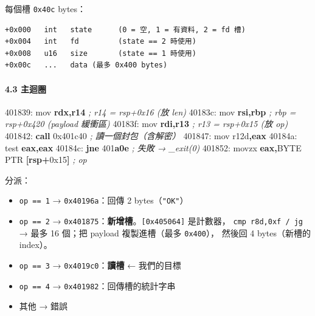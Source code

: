 \documentclass[10pt,a4paper]{article}
\newenvironment{Shaded}{\begin{snugshade}}{\end{snugshade}}
\newcommand{\BaseNTok}[1]{\textcolor[rgb]{0.00,0.00,0.81}{#1}}
\newcommand{\BuiltInTok}[1]{#1}
\newcommand{\CommentTok}[1]{\textcolor[rgb]{0.56,0.35,0.01}{\textit{#1}}}
\newcommand{\ControlFlowTok}[1]{\textcolor[rgb]{0.13,0.29,0.53}{\textbf{#1}}}
\newcommand{\DataTypeTok}[1]{\textcolor[rgb]{0.13,0.29,0.53}{#1}}
\newcommand{\DecValTok}[1]{\textcolor[rgb]{0.00,0.00,0.81}{#1}}
\newcommand{\ErrorTok}[1]{\textcolor[rgb]{0.64,0.00,0.00}{\textbf{#1}}}
\newcommand{\KeywordTok}[1]{\textcolor[rgb]{0.13,0.29,0.53}{\textbf{#1}}}
\newcommand{\NormalTok}[1]{#1}
\newcommand{\OperatorTok}[1]{\textcolor[rgb]{0.81,0.36,0.00}{\textbf{#1}}}
\renewenvironment{Shaded}{%
  \def\FrameCommand{\fboxsep=3.2pt\colorbox{shadecolor}}%
  \MakeFramed{\advance\hsize-\width\FrameRestore\small}%
}{%
  \endMakeFramed
}
\providecommand{\tightlist}{%
  \setlength{\itemsep}{0pt}\setlength{\parskip}{0pt}}
\begin{document}
每個槽 \texttt{0x40c} bytes：

\begin{Verbatim}[breaklines=true,breakanywhere=true,breakautoindent=false,fontsize=\fontsize{7.0}{9.5}\selectfont]
+0x000   int   state      (0 = 空, 1 = 有資料, 2 = fd 槽)
+0x004   int   fd         (state == 2 時使用)
+0x008   u16   size       (state == 1 時使用)
+0x00c   ...   data (最多 0x400 bytes)
\end{Verbatim}

\paragraph{4.3 主迴圈}\label{ux4e3bux8ff4ux5708}

\begin{Shaded}
\begin{Highlighting}[]
\NormalTok{401839:  }\BuiltInTok{mov}  \KeywordTok{rdx}\OperatorTok{,}\KeywordTok{r14}        \CommentTok{; r14 = rsp+0x16  (放 len)}
\NormalTok{40183c:  }\BuiltInTok{mov}  \KeywordTok{rsi}\OperatorTok{,}\KeywordTok{rbp}        \CommentTok{; rbp = rsp+0x420 (payload 緩衝區)}
\NormalTok{40183f:  }\BuiltInTok{mov}  \KeywordTok{rdi}\OperatorTok{,}\KeywordTok{r13}        \CommentTok{; r13 = rsp+0x15  (放 op)}
\NormalTok{401842:  }\ControlFlowTok{call} \BaseNTok{0x401c40}       \CommentTok{; 讀一個封包（含解密）}
\NormalTok{401847:  }\BuiltInTok{mov}\NormalTok{  r12d}\OperatorTok{,}\KeywordTok{eax}
\NormalTok{40184a:  }\BuiltInTok{test} \KeywordTok{eax}\OperatorTok{,}\KeywordTok{eax}
\NormalTok{40184c:  }\ControlFlowTok{jne}  \DecValTok{401}\ErrorTok{a0e}         \CommentTok{; 失敗 → \_exit(0)}
\NormalTok{401852:  }\BuiltInTok{movzx} \KeywordTok{eax}\OperatorTok{,}\DataTypeTok{BYTE} \DataTypeTok{PTR} \OperatorTok{[}\KeywordTok{rsp}\OperatorTok{+}\BaseNTok{0x15}\OperatorTok{]}   \CommentTok{; op}
\end{Highlighting}
\end{Shaded}

分派：

\begin{itemize}
\tightlist
\item
  \texttt{op\ \allowbreak{}==\ \allowbreak{}1} → \texttt{0x40196a}：回傳 2 bytes（\texttt{"OK"}）
\item
  \texttt{op\ \allowbreak{}==\ \allowbreak{}2} →
  \texttt{0x401875}：\textbf{新增槽}。\texttt{{[}0x405064{]}} 是計數器，
  \texttt{cmp\ \allowbreak{}r8d,\allowbreak{}0xf\ \allowbreak{}/\allowbreak{}\ \allowbreak{}jg} → 最多 16 個；把 payload 複製進槽（最多
  \texttt{0x400}）， 然後回 4 bytes（新槽的 index）。
\item
  \texttt{op\ \allowbreak{}==\ \allowbreak{}3} → \texttt{0x4019c0}：\textbf{讀槽} ← 我們的目標
\item
  \texttt{op\ \allowbreak{}==\ \allowbreak{}4} → \texttt{0x401982}：回傳槽的統計字串
\item
  其他 → 錯誤
\end{itemize}
\end{document}
